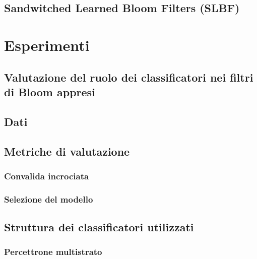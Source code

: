 \documentclass{report}
\begin{document}
    \section{Sandwitched Learned Bloom Filters (SLBF)}

\chapter{Esperimenti}

\section{Valutazione del ruolo dei classificatori nei filtri di Bloom appresi}

\section{Dati}

\section{Metriche di valutazione}
\subsection{Convalida incrociata} %
\subsection{Selezione del modello} %

\section{Struttura dei classificatori utilizzati}
\subsection{Percettrone multistrato}
\end{document}
